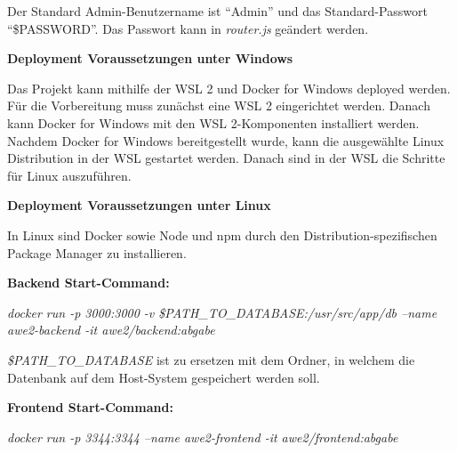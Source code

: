 Der Standard Admin-Benutzername ist \enquote{Admin} und das Standard-Passwort \enquote{\$PASSWORD}. Das Passwort kann in \textit{router.js} geändert werden.

\textbf{Deployment Voraussetzungen unter Windows}

Das Projekt kann mithilfe der WSL 2 und Docker for Windows deployed werden.
Für die Vorbereitung muss zunächst eine WSL 2 eingerichtet werden.
Danach kann Docker for Windows mit den WSL 2-Komponenten installiert werden.
Nachdem Docker for Windows bereitgestellt wurde, kann die ausgewählte Linux Distribution in der WSL gestartet werden.
Danach sind in der WSL die Schritte für Linux auszuführen.

\textbf{Deployment Voraussetzungen unter Linux}

In Linux sind Docker sowie Node und npm durch den Distribution-spezifischen Package Manager zu installieren.

\textbf{Backend Start-Command:}

\textit{docker run -p 3000:3000 -v \$PATH\_TO\_DATABASE:/usr/src/app/db --name awe2-backend -it awe2/backend:abgabe}

\textit{\$PATH\_TO\_DATABASE} ist zu ersetzen mit dem Ordner, in welchem die Datenbank auf dem Host-System gespeichert werden soll.

\textbf{Frontend Start-Command:}

\textit{docker run -p 3344:3344 --name awe2-frontend -it awe2/frontend:abgabe}
